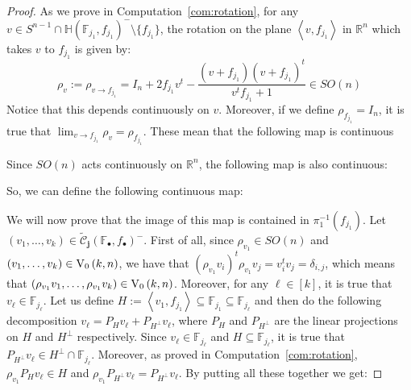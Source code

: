 \begin{proof}
As we prove in Computation~\ref{com:rotation}, for any $v\in S^{n-1}\cap\mathbb{H}{\left(\mathbb{F}_{j_1},f_{j_1}\right)}^-\setminus\{f_{j_1}\}$, the rotation on the plane $\left<v,f_{j_1}\right>$ in $\mathbb{R}^n$ which takes $v$ to $f_{j_1}$ is given by:
\[\rho_v:=\rho_{v\to f_{j_1}}=I_n+2f_{j_1}v^t-\frac{(v+f_{j_1})(v+f_{j_1})^t}{v^tf_{j_1}+1}\in SO(n)\]
Notice that this depends continuously on $v$. Moreover, if we define $\rho_{f_{j_1}}=I_n$, it is true that $\lim_{v\to f_{j_1}}\rho_v=\rho_{f_{j_1}}$. These mean that the following map is continuous
\begin{center}
\end{center}
Since $SO(n)$ acts continuously on $\mathbb{R}^n$, the following map is also continuous:
\begin{center}
\end{center}
So, we can define the following continuous map:
\begin{center}
\end{center}
We will now prove that the image of this map is contained in $\pi_1^{-1}(f_{j_1})$. Let $(v_1,\ldots,v_k)\in\tilde{\mathcal{C}}_{\mathbf{j}}{\left(\mathbb{F}_{\bullet},f_{\bullet}\right)}^-$. First of all, since $\rho_{v_1}\in SO(n)$ and $(v_1,\ldots,v_k)\in\StO{k}{n}$, we have that $(\rho_{v_1}v_i)^t\rho_{v_1}v_j=v_i^tv_j=\delta_{i,j}$, which means that $(\rho_{v_1}v_1,\ldots,\rho_{v_1}v_k)\in\StO{k}{n}$. Moreover, for any $\ell\in[k]$, it is true that $v_{\ell}\in\mathbb{F}_{j_{\ell}}$. Let us define $H:=\left<v_1,f_{j_1}\right>\subseteq\mathbb{F}_{j_1}\subseteq\mathbb{F}_{j_{\ell}}$ and then do the following decomposition $v_{\ell}=P_Hv_{\ell}+P_{H^{\perp}}v_{\ell}$, where $P_H$ and $P_{H^{\perp}}$ are the linear projections on $H$ and $H^{\perp}$ respectively. Since $v_{\ell}\in\mathbb{F}_{j_{\ell}}$ and $H\subseteq\mathbb{F}_{j_{\ell}}$, it is true that $P_{H^{\perp}}v_{\ell}\in H^{\perp}\cap\mathbb{F}_{j_{\ell}}$. Moreover, as proved in Computation~\ref{com:rotation}, $\rho_{v_1}P_Hv_{\ell}\in H$ and $\rho_{v_1}P_{H^{\perp}}v_{\ell}=P_{H^{\perp}}v_{\ell}$. By putting all these together we get:

\end{proof}
